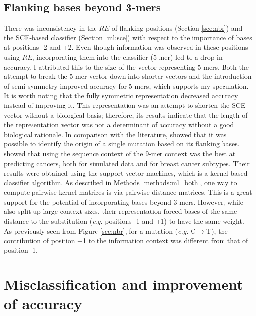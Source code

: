 \subsection{Flanking bases beyond 3-mers}
There was inconsistency in the $RE$ of flanking positions (Section \ref{sce:nbr}) and the SCE-based classifier (Section \ref{ml:sce}) with respect to the importance of bases at positions -2 and +2. Even though information was observed in these positions using $RE$, incorporating them into the classifier (5-mer) led to a drop in accuracy. I attributed this to the size of the vector representing 5-mers. Both the attempt to break the 5-mer vector down into shorter vectors and the introduction of semi-symmetry improved accuracy for 5-mers, which supports my speculation. It is worth noting that the fully symmetric representation decreased accuracy instead of improving it. This representation was an attempt to shorten the SCE vector without a biological basis; therefore, its results indicate that the length of the representation vector was not a determinant of accuracy without a good biological rationale. In comparison with the literature, \citet{Zhu2020} showed that it was possible to identify the origin of a single mutation based on its flanking bases. \citep{Zhang2020} showed that using the sequence context of the 9-mer context was the best at predicting cancers, both for simulated data and for breast cancer subtypes. Their results were obtained using the support vector machines, which is a kernel based classifier algorithm. As described in Methods \ref{methods:ml_both}, one way to compute pairwise kernel matrices is via pairwise distance matrices.  This is a great support for the potential of incorporating bases beyond 3-mers. However, while \citet{Zhang2020} also split up large context sizes, their representation forced bases of the same distance to the substitution (\textit{e.g.} positions -1 and +1) to have the same weight. As previously seen from Figure \ref{sce:nbr}, for a mutation (\textit{e.g.} C$\rightarrow$T), the contribution of position +1 to the information context was different from that of position -1.

\section{Misclassification and improvement of accuracy}
